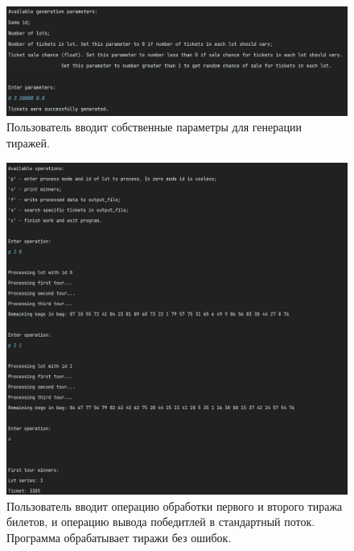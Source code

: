 \documentclass[a4paper,14pt]{article}
\begin{document}
\begin{figure}[H]
  \centering
  \captionsetup{justification=centering,margin=1cm}
  \includegraphics[width=\linewidth]{pictures/9}
  \caption{Пользователь вводит собственные параметры для генерации тиражей.}
\end{figure}
\begin{figure}[H]
  \centering
  \captionsetup{justification=centering,margin=1cm}
  \includegraphics[width=\linewidth]{pictures/1}
  \caption{Пользователь вводит операцию обработки первого и второго тиража билетов, и операцию вывода победитлей в стандартный поток. Программа обрабатывает тиражи без ошибок.}
\end{figure}
\end{document}
